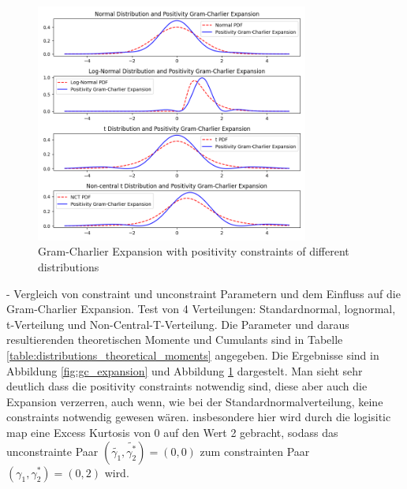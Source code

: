 \begin{figure}[h]
    \centering
    \includegraphics[width=0.8\textwidth]{img/gc_positivity_expansion.png}
    \caption{Gram-Charlier Expansion with positivity constraints of different distributions}
    \label{fig:gc_positivity_expansion}
\end{figure}

- Vergleich von constraint und unconstraint Parametern und dem Einfluss auf die Gram-Charlier Expansion. Test von 4 Verteilungen: Standardnormal, lognormal, t-Verteilung und Non-Central-T-Verteilung. Die Parameter und daraus resultierenden theoretischen Momente und Cumulants sind in Tabelle \ref{table:distributions_theoretical_moments} angegeben. Die Ergebnisse sind in Abbildung \ref{fig:gc_expansion} und Abbildung \ref{fig:gc_positivity_expansion} dargestelt. Man sieht sehr deutlich dass die positivity constraints notwendig sind, diese aber auch die Expansion verzerren, auch wenn, wie bei der Standardnormalverteilung, keine constraints notwendig gewesen wären. insbesondere hier wird durch die logisitic map eine Excess Kurtosis von 0 auf den Wert 2 gebracht, sodass das unconstrainte Paar $(\tilde{\gamma_1}, \tilde{\gamma_2^*}) = (0,0)$ zum constrainten Paar $(\gamma_1, \gamma_2^*) = (0,2)$ wird.

